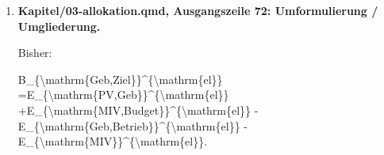 \documentclass[
  ngerman,
  a4paper,
  DIV=11]{scrreprt}
\newenvironment{Shaded}{\begin{snugshade}}{\end{snugshade}}
\newcommand{\NormalTok}[1]{\textcolor[rgb]{0.00,0.23,0.31}{#1}}
\begin{document}
\begin{enumerate}
\begin{Shaded}
\begin{Highlighting}[]
\NormalTok{| Position | Beschreibung |}
\NormalTok{|{-}{-}{-}|{-}{-}{-}|}
\NormalTok{| \textbackslash{}(E\_\{\textbackslash{}mathrm\{PV,Geb\}\}\textbackslash{}) | Dem Gebäudesektor zugeordnete PV{-}Stromerzeugung |}
\NormalTok{| \textbackslash{}(E\_\{\textbackslash{}mathrm\{Geb,Betrieb\}\}\textbackslash{}) | Strombedarf für Betrieb und Nutzung der Gebäude |}
\NormalTok{| \textbackslash{}(E\_\{\textbackslash{}mathrm\{MIV\}\}\textbackslash{}) | Zu bilanzierender Strombedarf des individuellen motorisierten Verkehrs |}
\NormalTok{| \textbackslash{}(E\_\{\textbackslash{}mathrm\{MIV,Budget\}\}\textbackslash{}) | Einmalig zugeteilter zentraler Erneuerbaren{-}Anteil für MIV |}
\NormalTok{| \textbackslash{}(B\_\{\textbackslash{}mathrm\{Geb,Ziel\}\}\textbackslash{}) | Resultierender, konsistent abgegrenzter nationaler Gebäudesektorsaldo |}

\NormalTok{Das Vorzeichen eines Saldos wird als *Erzeugung beziehungsweise Deckung minus zugeordneter Bedarf* ausgewiesen. Eine schematische Darstellung – **nur bei gleicher Bilanzgrenze und ausschließlich elektrischen Größen** – lautet:}
\end{Highlighting}
\end{Shaded}

  Jetzt:

\begin{Shaded}
\begin{Highlighting}[]
\NormalTok{Ein negativer Rest $E\_\{\textbackslash{}mathrm\{Z\}\}{-}E\_\{\textbackslash{}mathrm\{V\}\}$ wird als zentrale Unterdeckung ausgewiesen. Ein Rest oberhalb des MIV{-}Bedarfs bleibt unverteilt.}
\end{Highlighting}
\end{Shaded}
\item
  \textbf{Kapitel/03-allokation.qmd, Ausgangszeile 72: Umformulierung /
  Umgliederung.}

  Bisher:

\begin{Shaded}
\begin{Highlighting}[]
\NormalTok{B\_\{\textbackslash{}mathrm\{Geb,Ziel\}\}\^{}\{\textbackslash{}mathrm\{el\}\}}
\NormalTok{=E\_\{\textbackslash{}mathrm\{PV,Geb\}\}\^{}\{\textbackslash{}mathrm\{el\}\}}
\NormalTok{+E\_\{\textbackslash{}mathrm\{MIV,Budget\}\}\^{}\{\textbackslash{}mathrm\{el\}\}}
\NormalTok{{-}E\_\{\textbackslash{}mathrm\{Geb,Betrieb\}\}\^{}\{\textbackslash{}mathrm\{el\}\}}
\NormalTok{{-}E\_\{\textbackslash{}mathrm\{MIV\}\}\^{}\{\textbackslash{}mathrm\{el\}\}.}
\end{Highlighting}
\end{Shaded}


\end{enumerate}
\end{document}
